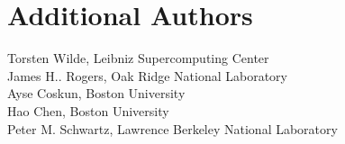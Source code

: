 \section {Additional Authors}
Torsten Wilde, Leibniz Supercomputing Center\\
James H.. Rogers, Oak Ridge National Laboratory\\
Ayse Coskun, Boston University\\
Hao Chen, Boston University\\
Peter M. Schwartz, Lawrence Berkeley National Laboratory
